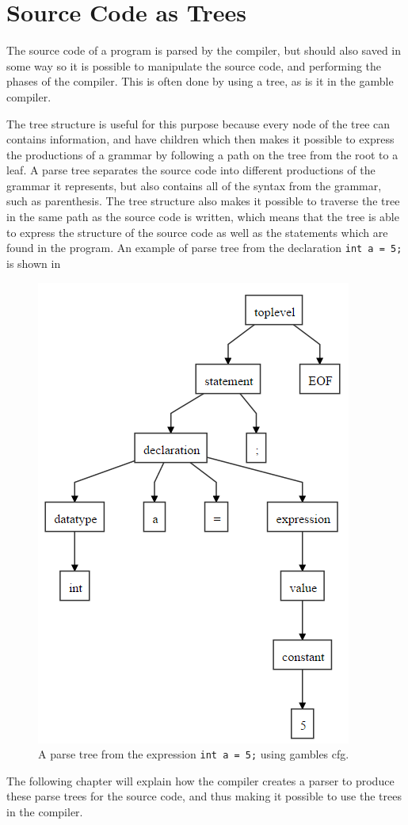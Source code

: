 \section{Source Code as Trees}\label{SourceCodeAsTrees}
The source code of a program is parsed by the compiler, but should also saved in some way so it is possible to manipulate the source code, and performing the phases of the compiler.
This is often done by using a tree, as is it in the \gls{gamble} compiler.

The tree structure is useful for this purpose because every node of the tree can contains information, and have children which then makes it possible to express the productions of a grammar by following a path on the tree from the root to a leaf.
A parse tree separates the source code into different productions of the grammar it represents, but also contains all of the syntax from the grammar, such as parenthesis.
The tree structure also makes it possible to traverse the tree in the same path as the source code is written, which means that the tree is able to express the structure of the source code as well as the statements which are found in the program.
An example of parse tree from the declaration \texttt{int a = 5;} is shown in 

\begin{figure}
    \centering
    \includegraphics[width=0.5\linewidth]{figures/Trees/PST.PNG}
    \caption{A parse tree from the expression \texttt{int a = 5;} using \glspl{gamble} \acrshort{cfg}.}\label{image:PST}
\end{figure}

The following chapter will explain how the compiler creates a parser to produce these parse trees for the source code, and thus making it possible to use the trees in the compiler.
